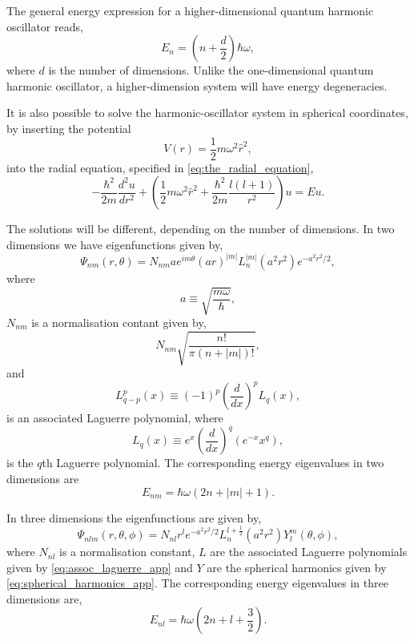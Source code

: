 The general energy expression for a higher-dimensional 
quantum harmonic oscillator reads,
\begin{equation}
    E_n = \left(n + \frac{d}{2} \right)\hbar\omega,
\end{equation}
where $d$ is the number of dimensions. Unlike the one-dimensional quantum harmonic 
oscillator, a higher-dimension system will have energy degeneracies.

It is also possible to solve the harmonic-oscillator system in 
spherical coordinates, by inserting the potential
\begin{equation*}    
    V(r) = \frac{1}{2}m \omega^2\hat{r}^2,
\end{equation*}
into the radial equation, specified in \autoref{eq:the_radial_equation},
\begin{equation}
    -\frac{\hbar^2}{2m}\frac{d^2u}{dr^2}
    + \left(
        \frac{1}{2}m\omega^2\hat{r}^2 
        + \frac{\hbar^2}{2m}\frac{l(l + 1)}{r^2} 
    \right)u = Eu.
\end{equation}

The solutions will be different, depending on the number of dimensions.
In two dimensions we have eigenfunctions given by,
\begin{equation}
    \Psi_{nm} (r,\theta) 
    = N_{nm}ae^{im\theta}(ar)^{|m|}L_n^{|m|}(a^2r^2)e^{-a^2r^2/2},
\end{equation}
where 
\begin{equation*}
    a \equiv \sqrt{\frac{m\omega}{\hbar}},
\end{equation*}
$N_{nm}$ is a normalisation contant given by,
\begin{equation*}
    N_{nm} \sqrt{\frac{n!}{\pi(n + |m|)!}},
\end{equation*}
and
\begin{equation}
    \label{eq:assoc_laguerre_app}
    L^p_{q-p}(x) \equiv (-1)^p \left(\frac{d}{dx} \right)^p L_q(x),
\end{equation}
is an associated Laguerre polynomial, where 
\begin{equation}
    L_q(x) \equiv e^x \left(\frac{d}{dx} \right)^q (e^{-x}x^q),
\end{equation}
is the $q$th Laguerre polynomial. The corresponding energy eigenvalues in 
two dimensions are 
\begin{equation}
    E_{nm} = \hbar\omega(2n + |m| + 1).
\end{equation}

In three dimensions the eigenfunctions are given by,
\begin{equation}
    \Psi_{nlm}(r,\theta,\phi)
    =
    N_{nl}r^l e^{-a^2r^2/2}L_n^{l + \frac{1}{2}}(a^2r^2)Y^m_l(\theta,\phi),
\end{equation}
where $N_{nl}$ is a normalisation constant, $L$ are the associated Laguerre 
polynomials given by \autoref{eq:assoc_laguerre_app} and 
$Y$ are the spherical harmonics given by \autoref{eq:spherical_harmonics_app}.
The corresponding energy eigenvalues in three dimensions are,
\begin{equation}
    E_{nl} = \hbar\omega\left(2n + l + \frac{3}{2}\right).
\end{equation}

